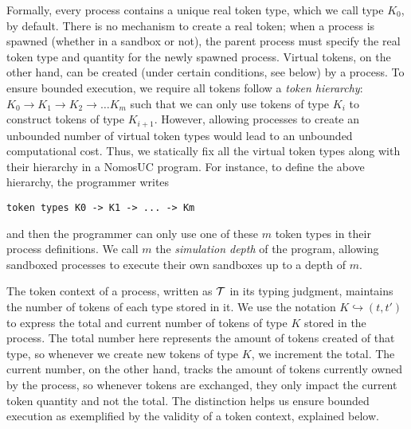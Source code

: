 Formally, every process contains a unique real token type, which we call type $K_0$, by default.
There is no mechanism to create a real token; when a process is spawned (whether in a sandbox or not),
the parent process must specify the real token type and quantity for the newly spawned process.
Virtual tokens, on the other hand, can be created (under certain conditions, see below) by a process.
To ensure bounded execution, we require all tokens follow a \emph{token hierarchy}: $K_0 \to K_1 \to K_2 \to \ldots K_m$
such that we can only use tokens of type $K_i$ to construct tokens of type $K_{i+1}$.
However, allowing processes to create an unbounded number of virtual token types would lead to
an unbounded computational cost.
Thus, we statically fix all the virtual token types along with their hierarchy in a NomosUC program.
For instance, to define the above hierarchy, the programmer writes
\begin{lstlisting}[basicstyle=\footnotesize\BeraMonottFamily]
  token types K0 -> K1 -> ... -> Km
\end{lstlisting}
and then the programmer can only use one of these $m$ token types in their process definitions.
We call $m$ the \emph{simulation depth} of the program, allowing sandboxed processes to execute their
own sandboxes up to a depth of $m$.

The token context of a process, written as $\mathcal{T}$ in its typing judgment, maintains the number
of tokens of each type stored in it.
We use the notation $K \hookrightarrow (t, t')$ to express the total and current number of tokens
of type $K$ stored in the process.
The total number here represents the amount of tokens created of that type, so whenever we create
new tokens of type $K$, we increment the total.
The current number, on the other hand, tracks the amount of tokens currently owned by the process,
so whenever tokens are exchanged, they only impact the current token quantity and not the total.
The distinction helps us ensure bounded execution as exemplified by the validity of a token context, explained below.


